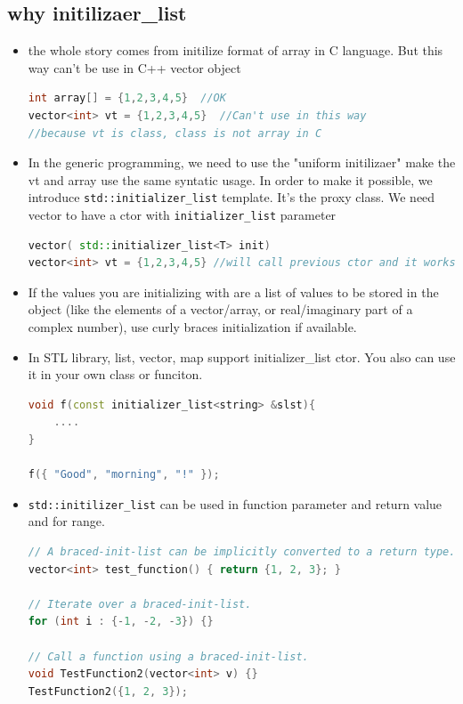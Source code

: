 \documentclass[a4paper,11pt,twoside]{book}
\begin{document}
\subsection{why initilizaer\_list}
\begin{itemize}
	\item the whole story comes from initilize format of array in C language. But this way can't be use in C++ vector object
\begin{lstlisting}[frame=single, language=c++,mathescape=true]
int array[] = {1,2,3,4,5}  //OK 
vector<int> vt = {1,2,3,4,5}  //Can't use in this way
//because vt is class, class is not array in C
\end{lstlisting}
	
	\item In the generic programming, we need to use the "uniform initilizaer"  make the vt and array use the same syntatic usage. In order to make it possible, we introduce \texttt{std::initializer\_list} template. It's the proxy class. We need vector to have a ctor with \texttt{initializer\_list} parameter
\begin{lstlisting}[frame=single, language=c++,mathescape=true]
vector( std::initializer_list<T> init)
vector<int> vt = {1,2,3,4,5} //will call previous ctor and it works. 
\end{lstlisting}
	
	\item If the values you are initializing with are a list of values to be stored in the object (like the elements of a vector/array, or real/imaginary part of a complex number), use curly braces initialization if available.
	
	\item In STL library, list, vector, map support initializer\_list ctor. You also can use it in your own class or funciton.
\begin{lstlisting}[frame=single, language=c++,mathescape=true]
void f(const initializer_list<string> &slst){
	....
}
	
f({ "Good", "morning", "!" });
\end{lstlisting}
	
	\item \texttt{std::initilizer\_list} can be used in function parameter and return value and for range.  
\begin{lstlisting}[frame=single, language=c++,mathescape=true]
// A braced-init-list can be implicitly converted to a return type.
vector<int> test_function() { return {1, 2, 3}; }
	
// Iterate over a braced-init-list.
for (int i : {-1, -2, -3}) {}
	
// Call a function using a braced-init-list.
void TestFunction2(vector<int> v) {}
TestFunction2({1, 2, 3}); 
\end{lstlisting}

\end{itemize}
\end{document}
